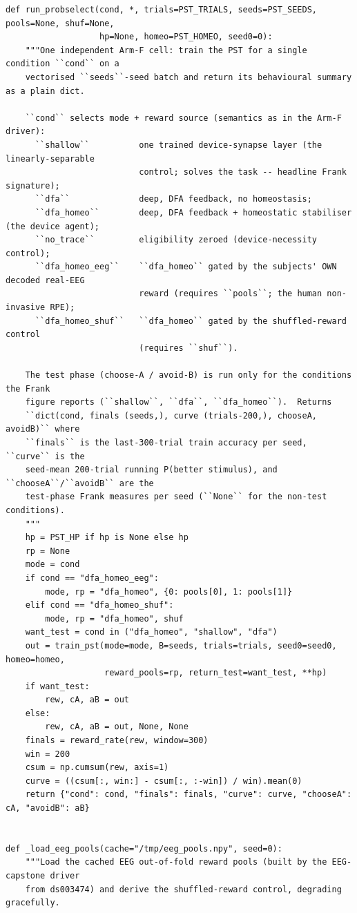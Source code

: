 \begin{lstlisting}[caption={mrl\_trace/probselect.py},label={lst:siox-src-probselect}]
def run_probselect(cond, *, trials=PST_TRIALS, seeds=PST_SEEDS, pools=None, shuf=None,
                   hp=None, homeo=PST_HOMEO, seed0=0):
    """One independent Arm-F cell: train the PST for a single condition ``cond`` on a
    vectorised ``seeds``-seed batch and return its behavioural summary as a plain dict.

    ``cond`` selects mode + reward source (semantics as in the Arm-F driver):
      ``shallow``          one trained device-synapse layer (the linearly-separable
                           control; solves the task -- headline Frank signature);
      ``dfa``              deep, DFA feedback, no homeostasis;
      ``dfa_homeo``        deep, DFA feedback + homeostatic stabiliser (the device agent);
      ``no_trace``         eligibility zeroed (device-necessity control);
      ``dfa_homeo_eeg``    ``dfa_homeo`` gated by the subjects' OWN decoded real-EEG
                           reward (requires ``pools``; the human non-invasive RPE);
      ``dfa_homeo_shuf``   ``dfa_homeo`` gated by the shuffled-reward control
                           (requires ``shuf``).

    The test phase (choose-A / avoid-B) is run only for the conditions the Frank
    figure reports (``shallow``, ``dfa``, ``dfa_homeo``).  Returns
    ``dict(cond, finals (seeds,), curve (trials-200,), chooseA, avoidB)`` where
    ``finals`` is the last-300-trial train accuracy per seed, ``curve`` is the
    seed-mean 200-trial running P(better stimulus), and ``chooseA``/``avoidB`` are the
    test-phase Frank measures per seed (``None`` for the non-test conditions).
    """
    hp = PST_HP if hp is None else hp
    rp = None
    mode = cond
    if cond == "dfa_homeo_eeg":
        mode, rp = "dfa_homeo", {0: pools[0], 1: pools[1]}
    elif cond == "dfa_homeo_shuf":
        mode, rp = "dfa_homeo", shuf
    want_test = cond in ("dfa_homeo", "shallow", "dfa")
    out = train_pst(mode=mode, B=seeds, trials=trials, seed0=seed0, homeo=homeo,
                    reward_pools=rp, return_test=want_test, **hp)
    if want_test:
        rew, cA, aB = out
    else:
        rew, cA, aB = out, None, None
    finals = reward_rate(rew, window=300)
    win = 200
    csum = np.cumsum(rew, axis=1)
    curve = ((csum[:, win:] - csum[:, :-win]) / win).mean(0)
    return {"cond": cond, "finals": finals, "curve": curve, "chooseA": cA, "avoidB": aB}


def _load_eeg_pools(cache="/tmp/eeg_pools.npy", seed=0):
    """Load the cached EEG out-of-fold reward pools (built by the EEG-capstone driver
    from ds003474) and derive the shuffled-reward control, degrading gracefully.


\end{lstlisting}

